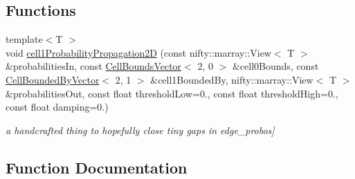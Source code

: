 \subsection*{Functions}
\begin{DoxyCompactItemize}
\item 
{\footnotesize template$<$T $>$ }\\void \hyperlink{namespacenifty_1_1cgp_a843b0dda23907002418edcd4765cdae1}{cell1\+Probability\+Propagation2\+D} (const nifty\+::marray\+::\+View$<$ T $>$ \&probabilities\+In, const \hyperlink{classnifty_1_1cgp_1_1CellBoundsVector}{Cell\+Bounds\+Vector}$<$ 2, 0 $>$ \&cell0\+Bounds, const \hyperlink{classnifty_1_1cgp_1_1CellBoundedByVector}{Cell\+Bounded\+By\+Vector}$<$ 2, 1 $>$ \&cell1\+Bounded\+By, nifty\+::marray\+::\+View$<$ T $>$ \&probabilities\+Out, const float threshold\+Low=0., const float threshold\+High=0., const float damping=0.)
\begin{DoxyCompactList}\small\item\em a handcrafted thing to hopefully close tiny gaps in edge\+\_\+probos\mbox{]} \end{DoxyCompactList}\end{DoxyCompactItemize}


\subsection{Function Documentation}
\hypertarget{namespacenifty_1_1cgp_a843b0dda23907002418edcd4765cdae1}{}
